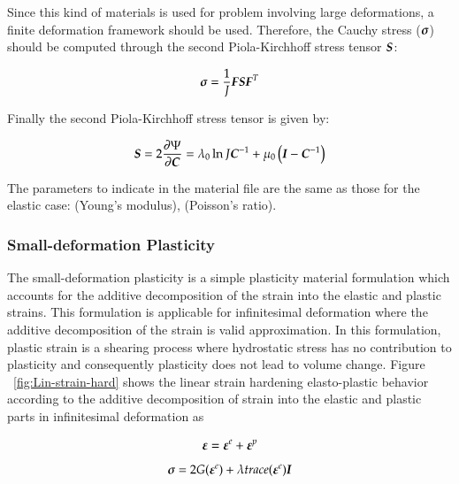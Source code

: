 Since this kind of materials is used for problem involving large deformations, a finite
deformation framework should be used. Therefore, the Cauchy stress ($\boldsymbol{\sigma}$) should
be computed through the second Piola-Kirchhoff stress tensor $\boldsymbol{S}$:

\begin{equation}
  \boldsymbol{\sigma } = \frac{1}{J}\boldsymbol{F}\boldsymbol{S}\boldsymbol{F}^T
\end{equation}

Finally the second Piola-Kirchhoff stress tensor is given by:

\begin{equation}
  \boldsymbol{S}  = 2\frac{\partial\Psi}{\partial\boldsymbol{C}} = \lambda_0\ln J 
\boldsymbol{C}^{-1}+\mu_0\left(\boldsymbol{I}-\boldsymbol{C}^{-1}\right)
\end{equation}

The parameters to indicate in the material file are the same
as those for the elastic case:  (Young's modulus),  (Poisson's
ratio).

\subsubsection{Small-deformation Plasticity}

The small-deformation plasticity is a simple plasticity material formulation which accounts for the additive decomposition of the strain into the elastic and plastic strains. This formulation is applicable for infinitesimal deformation where the additive decomposition of the strain is valid approximation. In this formulation, plastic strain is a shearing process where hydrostatic stress has no contribution to plasticity and consequently plasticity does not lead to
volume change. Figure ~\ref{fig:Lin-strain-hard} shows the linear strain hardening elasto-plastic behavior according to the additive decomposition of strain into the elastic and plastic parts in infinitesimal deformation as

\begin{equation} \label{strain decomposition}
	\boldsymbol{\varepsilon} = \boldsymbol{\varepsilon}^e +\boldsymbol{\varepsilon}^p
\end{equation}  
\begin{equation} \label{Hooks law}
	{\ensuremath{\boldsymbol{\sigma}}} = 2G(\boldsymbol{\varepsilon}^e) + \lambda  trace(\boldsymbol{\varepsilon}^e)\boldsymbol{I}
\end{equation}

